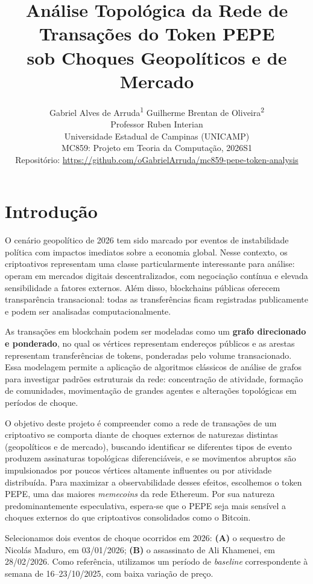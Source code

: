 \documentclass[12pt,a4paper]{article}
\title{Análise Topológica da Rede de Transações do Token PEPE \\ sob Choques Geopolíticos e de Mercado}
\author{
  Gabriel Alves de Arruda\textsuperscript{1} \quad Guilherme Brentan de Oliveira\textsuperscript{2} \\[6pt]
  \small Professor Ruben Interian \\
  \small Universidade Estadual de Campinas (UNICAMP) \\
  \small MC859: Projeto em Teoria da Computação, 2026S1 \\[6pt]
  \small Repositório: \url{https://github.com/oGabrielArruda/mc859-pepe-token-analysis}
}
\date{}
\begin{document}
\maketitle

\section{Introdução}

O cenário geopolítico de 2026 tem sido marcado por eventos de instabilidade política com impactos imediatos sobre a economia global. Nesse contexto, os criptoativos representam uma classe particularmente interessante para análise: operam em mercados digitais descentralizados, com negociação contínua e elevada sensibilidade a fatores externos. Além disso, blockchains públicas oferecem transparência transacional: todas as transferências ficam registradas publicamente e podem ser analisadas computacionalmente.

As transações em blockchain podem ser modeladas como um \textbf{grafo direcionado e ponderado}, no qual os vértices representam endereços públicos e as arestas representam transferências de tokens, ponderadas pelo volume transacionado. Essa modelagem permite a aplicação de algoritmos clássicos de análise de grafos para investigar padrões estruturais da rede: concentração de atividade, formação de comunidades, movimentação de grandes agentes e alterações topológicas em períodos de choque.

O objetivo deste projeto é compreender como a rede de transações de um criptoativo se comporta diante de choques externos de naturezas distintas (geopolíticos e de mercado), buscando identificar se diferentes tipos de evento produzem assinaturas topológicas diferenciáveis, e se movimentos abruptos são impulsionados por poucos vértices altamente influentes ou por atividade distribuída. Para maximizar a observabilidade desses efeitos, escolhemos o token PEPE, uma das maiores \textit{memecoins} da rede Ethereum. Por sua natureza predominantemente especulativa, espera-se que o PEPE seja mais sensível a choques externos do que criptoativos consolidados como o Bitcoin.

Selecionamos dois eventos de choque ocorridos em 2026: \textbf{(A)} o sequestro de Nicolás Maduro, em 03/01/2026; \textbf{(B)} o assassinato de Ali Khamenei, em 28/02/2026. Como referência, utilizamos um período de \textit{baseline} correspondente à semana de 16--23/10/2025, com baixa variação de preço.
\end{document}
